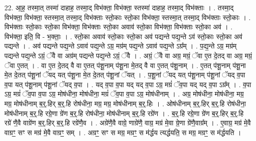\documentclass[17pt]{extarticle}
\begin{document}
22. आ॒ह॒ तस्मा॒त् तस्मा॑ दाहाह॒ तस्मा॒द् विभ॑क्ता॒ विभ॑क्ता॒ स्तस्मा॑ दाहाह॒ तस्मा॒द् विभ॑क्ताः । . तस्मा॒द् विभ॑क्ता॒ विभ॑क्ता॒ स्तस्मा॒त् तस्मा॒द् विभ॑क्ताः स्तो॒काः स्तो॒का विभ॑क्ता॒ स्तस्मा॒त् तस्मा॒द् विभ॑क्ताः स्तो॒काः । . विभ॑क्ताः स्तो॒काः स्तो॒का विभ॑क्ता॒ विभ॑क्ताः स्तो॒का अवाव॑ स्तो॒का विभ॑क्ता॒ विभ॑क्ताः स्तो॒का अव॑ । . विभ॑क्ता॒ इति॒ वि - भ॒क्ताः॒ । . स्तो॒का अवाव॑ स्तो॒काः स्तो॒का अव॑ पद्यन्ते पद्य॒न्ते ऽव॑ स्तो॒काः स्तो॒का अव॑ पद्यन्ते । . अव॑ पद्यन्ते पद्य॒न्ते ऽवाव॑ पद्य॒न्ते ऽग्र॒ मग्र॑म् पद्य॒न्ते ऽवाव॑ पद्य॒न्ते ऽग्र᳚म् । . प॒द्य॒न्ते ऽग्र॒ मग्र॑म् पद्यन्ते पद्य॒न्ते ऽग्रं॒ ॅवै वा अग्र॑म् पद्यन्ते पद्य॒न्ते ऽग्रं॒ ॅवै । . अग्रं॒ ॅवै वा अग्र॒ मग्रं॒ ॅवा ए॒त दे॒तद् वा अग्र॒ मग्रं॒ ॅवा ए॒तत् । . वा ए॒त दे॒तद् वै वा ए॒तत् प॑शू॒नाम् प॑शू॒ना मे॒तद् वै वा ए॒तत् प॑शू॒नाम् । . ए॒तत् प॑शू॒नाम् प॑शू॒ना मे॒त दे॒तत् प॑शू॒नां ॅयद् यत् प॑शू॒ना मे॒त दे॒तत् प॑शू॒नां ॅयत् । . प॒शू॒नां ॅयद् यत् प॑शू॒नाम् प॑शू॒नां ॅयद् व॒पा व॒पा यत् प॑शू॒नाम् प॑शू॒नां ॅयद् व॒पा । . यद् व॒पा व॒पा यद् यद् व॒पा ऽग्र॒ मग्रं॑ ॅव॒पा यद् यद् व॒पा ऽग्र᳚म् । . व॒पा ऽग्र॒ मग्रं॑ ॅव॒पा व॒पा ऽग्र॒ मोष॑धीना॒ मोष॑धीना॒ मग्रं॑ ॅव॒पा व॒पा ऽग्र॒ मोष॑धीनाम् । . अग्र॒ मोष॑धीना॒ मोष॑धीना॒ मग्र॒ मग्र॒ मोष॑धीनाम् ब॒र्॒.हिर् ब॒र्॒.हि रोष॑धीना॒ मग्र॒ मग्र॒ मोष॑धीनाम् ब॒र्॒.हिः । . ओष॑धीनाम् ब॒र्॒.हिर् ब॒र्॒.हि रोष॑धीना॒ मोष॑धीनाम् ब॒र्॒.हि रग्रे॒णा ग्रे॑ण ब॒र्॒.हि रोष॑धीना॒ मोष॑धीनाम् ब॒र्॒.हि रग्रे॑ण । . ब॒र्॒.हि रग्रे॒णा ग्रे॑ण ब॒र्॒.हिर् ब॒र्॒.हि रग्रे॑ णै॒वै वाग्रे॑ण ब॒र्॒.हिर् ब॒र्॒.हि रग्रे॑णै॒व । . अग्रे॑णै॒वै वाग्रे॒ णाग्रे॑णै॒ वाग्र॒ मग्र॑ मे॒वा ग्रे॒णा ग्रे॑णै॒वाग्र᳚म् । . ए॒वाग्र॒ मग्र॑ मे॒वै वाग्रꣳ॒॒ सꣳ स मग्र॑ मे॒वै वाग्रꣳ॒॒ सम् । . अग्रꣳ॒॒ सꣳ स मग्र॒ मग्रꣳ॒॒ स म॑र्द्धय त्यर्द्धयति॒ स मग्र॒ मग्रꣳ॒॒ स म॑र्द्धयति । \newline
\end{document}
